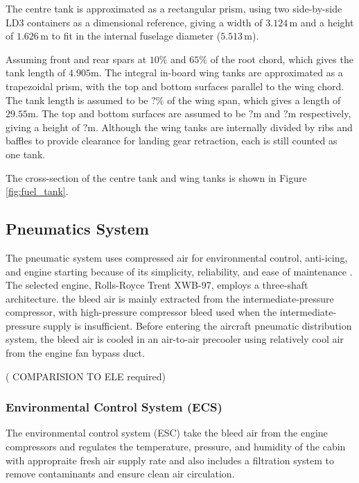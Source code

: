 The centre tank is approximated as a rectangular prism, using two side-by-side LD3 containers as a dimensional reference, giving a width of $3.124\,\mathrm{m}$ and a height of $1.626\,\mathrm{m}$ to fit in the internal fuselage diameter ($5.513\,\mathrm{m}$). 

Assuming front and rear spars at $10\%$ and $65\%$ of the root chord, which gives the tank length of $4.905\mathrm{ m}$. The integral in-board wing tanks are approximated as a trapezoidal prism, with the top and bottom surfaces parallel to the wing chord. The tank length is assumed to be $?\%$ of the wing span, which gives a length of $29.55\mathrm{ m}$. The top and bottom surfaces are assumed to be $?\mathrm{ m}$ and $?\mathrm{ m}$ respectively, giving a height of $?\mathrm{ m}$. Although the wing tanks are internally divided by ribs and baffles to provide clearance for landing gear retraction, each is still counted as one tank.

The cross-section of the centre tank and wing tanks is shown in Figure \ref{fig:fuel_tank}.


\subsection{Pneumatics System}
The pneumatic system uses compressed air for environmental control, anti-icing, and engine starting because of its simplicity, reliability, and ease of maintenance \cite{Raymer Book}. The selected engine, Rolls-Royce Trent XWB-97, employs a three-shaft architecture. the bleed air is mainly extracted from the intermediate-pressure compressor, with high-pressure compressor bleed used when the intermediate-pressure supply is insufficient. Before entering the aircraft pneumatic distribution system, the bleed air is cooled in an air-to-air precooler using relatively cool air from the engine fan bypass duct.

( COMPARISION TO ELE required)

\subsubsection{Environmental Control System (ECS)}
The environmental control system (ESC) take the bleed air from the engine compressors and regulates the temperature, pressure, and humidity of the cabin with appropraite fresh air supply rate and also includes a filtration system to remove contaminants and ensure clean air circulation.

